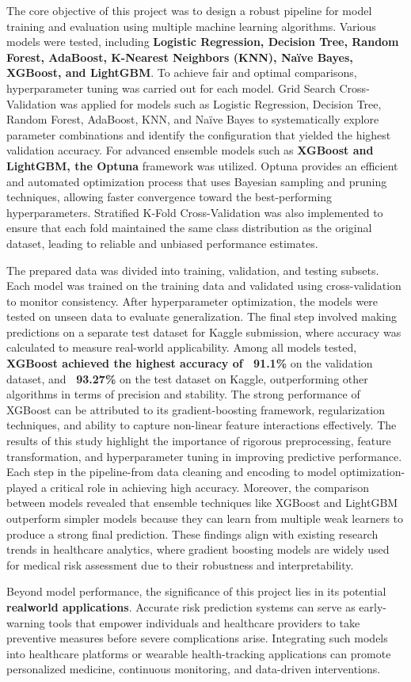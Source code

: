 The core objective of this project was to design a robust pipeline for model training and evaluation using multiple machine learning algorithms.
Various models were tested, including \textbf{Logistic Regression, Decision Tree, Random Forest, AdaBoost, K-Nearest Neighbors (KNN), Naïve Bayes, XGBoost, and LightGBM}. To achieve fair and optimal comparisons, hyperparameter tuning was carried out for each model.
Grid Search Cross-Validation was applied for models such as Logistic Regression, Decision Tree, Random Forest, AdaBoost, KNN, and Naïve Bayes to systematically explore parameter combinations and identify the configuration that yielded the highest validation accuracy.
For advanced ensemble models such as \textbf{XGBoost and LightGBM, the Optuna} framework was utilized.
Optuna provides an efficient and automated optimization process that uses Bayesian sampling and pruning techniques, allowing faster convergence toward the best-performing hyperparameters.
Stratified K-Fold Cross-Validation was also implemented to ensure that each fold maintained the same class distribution as the original dataset, leading to reliable and unbiased performance estimates.

The prepared data was divided into training, validation, and testing subsets.
Each model was trained on the training data and validated using cross-validation to monitor consistency.
After hyperparameter optimization, the models were tested on unseen data to evaluate generalization.
The final step involved making predictions on a separate test dataset for Kaggle submission, where accuracy was calculated to measure real-world applicability.
Among all models tested, \textbf{XGBoost achieved the highest accuracy of ~91.1\%} on the validation dataset, and \textbf{~93.27\%} on the test dataset on Kaggle, outperforming other algorithms in terms of precision and stability.
The strong performance of XGBoost can be attributed to its gradient-boosting framework, regularization techniques, and ability to capture non-linear feature interactions effectively.
The results of this study highlight the importance of rigorous preprocessing, feature transformation, and hyperparameter tuning in improving predictive performance.
Each step in the pipeline-from data cleaning and encoding to model optimization- played a critical role in achieving high accuracy.
Moreover, the comparison between models revealed that ensemble techniques like XGBoost and LightGBM outperform simpler models because they can learn from multiple weak learners to produce a strong final prediction.
These findings align with existing research trends in healthcare analytics, where gradient boosting models are widely used for medical risk assessment due to their robustness and interpretability.

Beyond model performance, the significance of this project lies in its potential \textbf{realworld applications}.
Accurate risk prediction systems can serve as early-warning tools that empower individuals and healthcare providers to take preventive measures before severe complications arise.
Integrating such models into healthcare platforms or wearable health-tracking applications can promote personalized medicine, continuous monitoring, and data-driven interventions.
